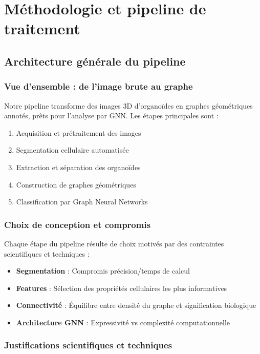 
\chapter{Méthodologie et pipeline de traitement}

\section{Architecture générale du pipeline}

\subsection{Vue d'ensemble : de l'image brute au graphe}

Notre pipeline transforme des images 3D d'organoïdes en graphes géométriques annotés, prêts pour l'analyse par GNN. Les étapes principales sont :
\begin{enumerate}
    \item Acquisition et prétraitement des images
    \item Segmentation cellulaire automatisée
    \item Extraction et séparation des organoïdes
    \item Construction de graphes géométriques
    \item Classification par Graph Neural Networks
\end{enumerate}

\subsection{Choix de conception et compromis}

Chaque étape du pipeline résulte de choix motivés par des contraintes scientifiques et techniques :
\begin{itemize}
    \item \textbf{Segmentation} : Compromis précision/temps de calcul
    \item \textbf{Features} : Sélection des propriétés cellulaires les plus informatives
    \item \textbf{Connectivité} : Équilibre entre densité du graphe et signification biologique
    \item \textbf{Architecture GNN} : Expressivité vs complexité computationnelle
\end{itemize}

\subsection{Justifications scientifiques et techniques}

